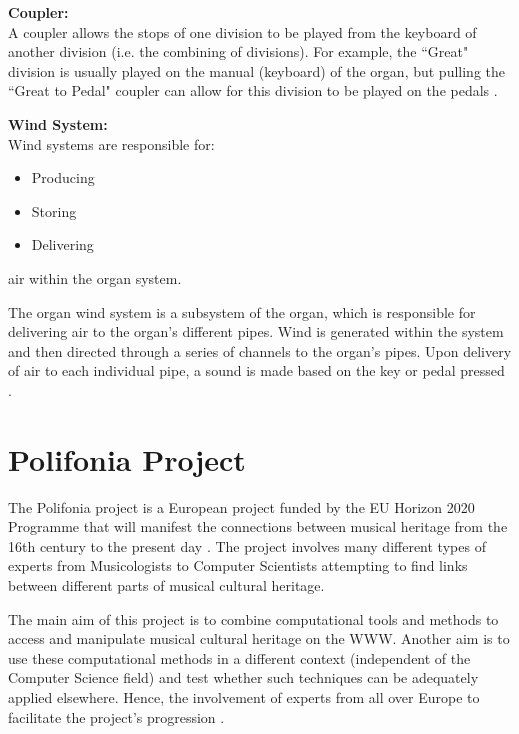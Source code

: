 \noindent \textbf{Coupler:}
\\ \hspace*{0.5cm} A coupler allows the stops of one division to be played from the keyboard of another division (i.e. the combining of divisions). For example, the ``Great" division is usually played on the manual (keyboard) of the organ, but pulling the ``Great to Pedal" coupler can allow for this division to be played on the pedals \cite{organvideo}.

\noindent \textbf{Wind System:}
\\ Wind systems are responsible for:

\vspace{-0.15cm}
\begin{itemize}
    \itemsep0em 
\item Producing
\vspace{-0.1cm}
\item Storing
\vspace{-0.1cm}
\item Delivering
\end{itemize}
\vspace{-0.15cm}

\noindent air within the organ system.

The organ wind system is a subsystem of the organ, which is responsible for delivering air to the organ's different pipes. Wind is generated within the system and then directed through a series of channels to the organ's pipes. Upon delivery of air to each individual pipe, a sound is made based on the key or pedal pressed \cite{organvideo}.

\section{Polifonia Project}
\hspace{0.5cm} The Polifonia project is a European project funded by the EU Horizon 2020 Programme that will manifest the connections between musical heritage from the 16th century to the present day \cite{polifonia}. The project involves many different types of experts from Musicologists to Computer Scientists attempting to find links between different parts of musical cultural heritage. 

The main aim of this project is to combine computational tools and methods to access and manipulate musical cultural heritage on the WWW. Another aim is to use these computational methods in a different context (independent of the Computer Science field) and test whether such techniques can be adequately applied elsewhere. Hence, the involvement of experts from all over Europe to facilitate the project's progression \cite{polifoniaproject}.

